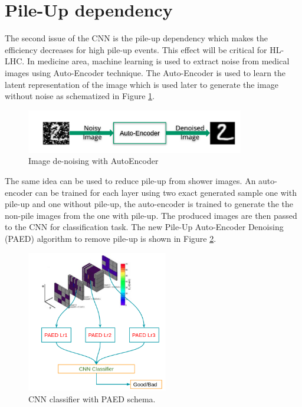 \section{Pile-Up dependency}
The second issue of the CNN is the pile-up dependency which makes the efficiency decreases for high pile-up events. This effect will be critical for HL-LHC. In medicine area, machine learning is used to extract noise from medical images using Auto-Encoder technique. The Auto-Encoder is used to learn the latent representation of the image which is used later to generate the image without noise as schematized in Figure \ref{fig:Adx3:AutoEncoder}.

\begin{figure}[H]
    \centering
    \includegraphics[width=0.85\textwidth]{Adx/Adx3/Img/AutoEncoder.png}
    \caption{Image de-noising with AutoEncoder}
    \label{fig:Adx3:AutoEncoder}
\end{figure}

The same idea can be used to reduce pile-up from shower images. An auto-encoder can be trained for each layer using two exact generated sample one with pile-up and one without pile-up, the auto-encoder is trained to generate the the non-pile images from the one with pile-up. The produced images are then passed to the CNN for classification task. The new Pile-Up Auto-Encoder Denoising (PAED) algorithm to remove pile-up is shown in Figure \ref{fig:Adx3:PAED}.

\begin{figure}[htbp]
    \centering
    \includegraphics[width=0.55\textwidth]{Adx/Adx3/Img/PAED.png}
    \begin{tcolorbox}[colback=black!5!white,colframe=white!75!black]
    \caption{CNN classifier with PAED schema.}
    \label{fig:Adx3:PAED}
    \end{tcolorbox}
    
\end{figure}